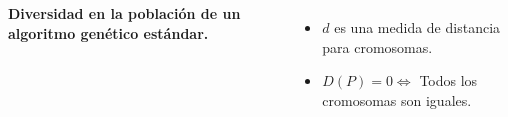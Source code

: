 {\begin{frame}{}
\begin{columns}[c]
				\fontsize{8.5}{10}
				\selectfont
				\textbf{Diversidad en la población de un algoritmo genético estándar.}

				\fontsize{8}{10}\selectfont
				\begin{itemize}
					\item $d$ es una medida de distancia para cromosomas.
					\item $D(P) = 0 \iff$ Todos los cromosomas son iguales. 
				\end{itemize}

		\end{columns}

	\end{frame}
}
			

